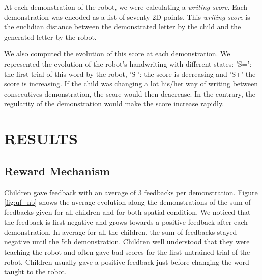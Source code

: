 \documentclass[letterpaper, 10 pt, conference]{ieeeconf}  %
\begin{document}
At each demonstration of the robot, we were calculating a \emph{writing score}. 
Each demonstration was encoded as a list of seventy 2D points.
This \emph{writing score} is the euclidian distance between the demonstrated letter by the child and the generated letter by the robot.

We also computed the evolution of this score at each demonstration.
We represented the evolution of the robot's handwriting with different states:
'S=': the first trial of this word by the robot, 'S-': the score is decreasing and 'S+' the score is increasing. 
If the child was changing a lot his/her way of writing between consecutives demonstration, the score would then deacrease.
In the contrary, the regularity of the demonstration would make the score increase rapidly.


\section{RESULTS}

\subsection{Reward Mechanism}
Children gave feedback with an average of 3 feedbacks per demonstration.
Figure \ref{fig:uf_nb} shows the average evolution along the demonstrations of the sum of feedbacks given for all children and for both spatial condition.
We noticed that the feedback is first negative and grows towards a positive feedback after each demonstration.
In average for all the children, the sum of feedbacks stayed negative until the 5th demonstration.
Children well understood that they were teaching the robot and often gave bad scores for the first untrained trial of the robot.
Children usually gave a positive feedback just before changing the word taught to the robot.
\end{document}
